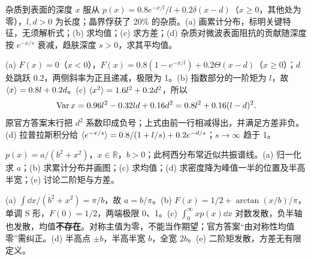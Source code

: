 \begin{exercise}
杂质到表面的深度 $x$ 服从 $p(x)=0.8e^{-x/l}/l+0.2\delta(x-d)$（$x\ge0$，其他处为零），$l,d>0$ 为长度；晶界俘获了 20\% 的杂质。(a) 画累计分布，标明关键特征，无须解析式；(b) 求均值；(c) 求方差；(d) 杂质对微波表面阻抗的贡献随深度按 $e^{-x/s}$ 衰减，趋肤深度 $s>0$，求其平均值。
\end{exercise}
\begin{solution}
(a) $F(x)=0$（$x<0$），$F(x)=0.8(1-e^{-x/l})+0.2\Theta(x-d)$（$x\ge0$）；$d$ 处跳跃 $0.2$，两侧斜率为正且递减，极限为 1。(b) 指数部分的一阶矩为 $l$，故 $\langle x\rangle=0.8l+0.2d$。(c) $\langle x^2\rangle=1.6l^2+0.2d^2$，所以
\[\operatorname{Var} x=0.96l^2-0.32ld+0.16d^2=0.8l^2+0.16(l-d)^2.\]
原官方答案末行把 $d^2$ 系数印成负号；上式由前一行相减得出，并满足方差非负。(d) 拉普拉斯积分给 $\langle e^{-x/s}\rangle=0.8/(1+l/s)+0.2e^{-d/s}$；$s\to\infty$ 趋于 1。
\end{solution}
\begin{center}\end{center}
\begin{exercise}
$p(x)=a/(b^2+x^2)$，$x\in\mathbb R$，$b>0$；此柯西分布常近似共振谱线。(a) 归一化求 $a$；(b) 求累计分布并画图；(c) 求均值；(d) 求密度降为峰值一半的位置及半高半宽；(e) 讨论二阶矩与方差。
\end{exercise}
\begin{solution}
(a) $\int\dd x/(b^2+x^2)=\pi/b$，故 $a=b/\pi$。(b) $F(x)=1/2+\arctan(x/b)/\pi$，单调 S 形，$F(0)=1/2$，两端极限 0、1。(c) $\int_0^\infty xp(x)\dd x$ 对数发散，负半轴也发散，均值\textbf{不存在}。对称主值为零，不能当作期望；官方答案“由对称性均值零”需纠正。(d) 半高点 $\pm b$，半高半宽 $b$，全宽 $2b$。(e) 二阶矩发散，方差无有限定义。
\end{solution}
\begin{center}\end{center}
